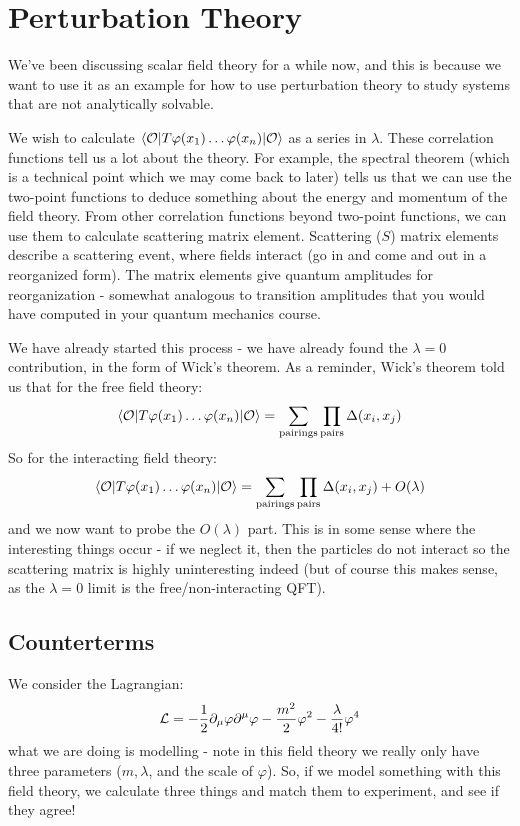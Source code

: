 \section{Perturbation Theory}
We've been discussing scalar field theory for a while now, and this is because we want to use it as an example for how to use perturbation theory to study systems that are not analytically solvable.

We wish to calculate $\bra{\O}T\varphi(x_1)\ldots\varphi(x_n)\ket{\O}$ as a series in $\lambda$. These correlation functions tell us a lot about the theory. For example, the spectral theorem (which is a technical point which we may come back to later) tells us that we can use the two-point functions to deduce something about the energy and momentum of the field theory. From other correlation functions beyond two-point functions, we can use them to calculate scattering matrix element. Scattering ($S$) matrix elements describe a scattering event, where fields interact (go in and come and out in a reorganized form). The matrix elements give quantum amplitudes for reorganization - somewhat analogous to transition amplitudes that you would have computed in your quantum mechanics course. 

We have already started this process - we have already found the $\lambda = 0$ contribution, in the form of Wick's theorem. As a reminder, Wick's theorem told us that for the free field theory:
\begin{equation}
   \bra{\O}T\varphi(x_1)\ldots\varphi(x_n)\ket{\O} = \sum_{\text{pairings}}\prod_{\text{pairs}}\Delta(x_i, x_j)
\end{equation}
So for the interacting field theory:
\begin{equation}
    \bra{\O}T\varphi(x_1)\ldots\varphi(x_n)\ket{\O} = \sum_{\text{pairings}}\prod_{\text{pairs}}\Delta(x_i, x_j) + O(\lambda)
 \end{equation}
and we now want to probe the $O(\lambda)$ part. This is in some sense where the interesting things occur - if we neglect it, then the particles do not interact so the scattering matrix is highly uninteresting indeed (but of course this makes sense, as the $\lambda = 0$ limit is the free/non-interacting QFT). 

\subsection{Counterterms}
We consider the Lagrangian:
\begin{equation}
   \L = -\frac{1}{2}\p_\mu \varphi \p^\mu \varphi - \frac{m^2}{2}\varphi^2 - \frac{\lambda}{4!}\varphi^4
\end{equation}
what we are doing is modelling - note in this field theory we really only have three parameters ($m, \lambda$, and the scale of $\varphi$). So, if we model something with this field theory, we calculate three things and match them to experiment, and see if they agree!

